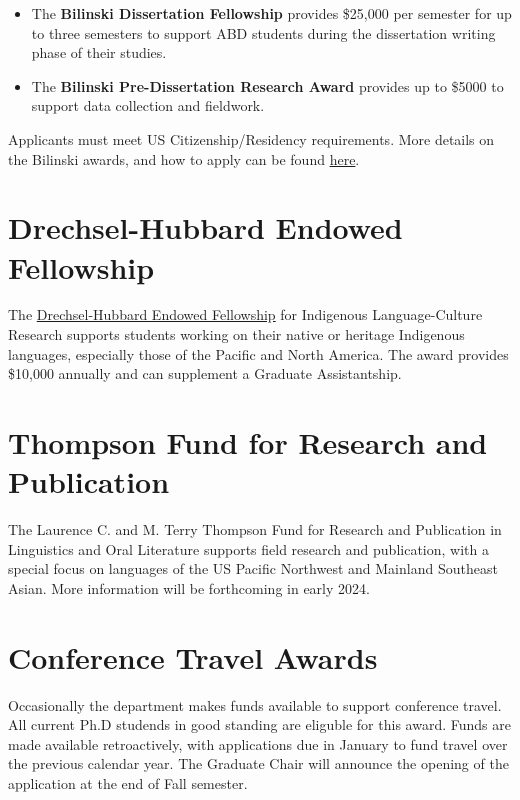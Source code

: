 \documentclass[
]{book}
\begin{document}
\begin{itemize}
\item
  The \textbf{Bilinski Dissertation Fellowship} provides \$25,000 per semester for up to three semesters to support ABD students during the dissertation writing phase of their studies.
\item
  The \textbf{Bilinski Pre-Dissertation Research Award} provides up to \$5000 to support data collection and fieldwork.
\end{itemize}

Applicants must meet US Citizenship/Residency requirements. More details on the Bilinski awards, and how to apply can be found \href{https://manoa.hawaii.edu/linguistics/bilinski/}{here}.

\section{Drechsel-Hubbard Endowed Fellowship}\label{drechsel-hubbard-endowed-fellowship}

The \href{https://manoa.hawaii.edu/linguistics/drechsel-hubbard-fellowship/}{Drechsel-Hubbard Endowed Fellowship} for Indigenous Language-Culture Research supports students working on their native or heritage Indigenous languages, especially those of the Pacific and North America. The award provides \$10,000 annually and can supplement a Graduate Assistantship.

\section{Thompson Fund for Research and Publication}\label{thompson-fund-for-research-and-publication}

The Laurence C. and M. Terry Thompson Fund for Research and Publication in Linguistics and Oral Literature supports field research and publication, with a special focus on languages of the US Pacific Northwest and Mainland Southeast Asian. More information will be forthcoming in early 2024.

\section{Conference Travel Awards}\label{conference-travel-awards}

Occasionally the department makes funds available to support conference travel. All current Ph.D studends in good standing are eliguble for this award. Funds are made available retroactively, with applications due in January to fund travel over the previous calendar year. The Graduate Chair will announce the opening of the application at the end of Fall semester.
\end{document}
